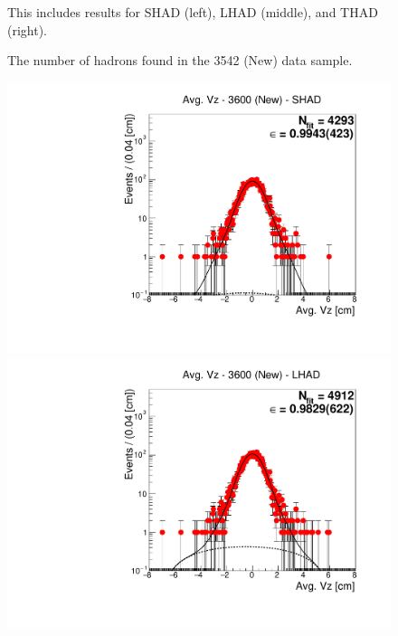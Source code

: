 \begin{figure}[H]
\caption{The number of hadrons found in the 3542 (New) data sample.}
{This includes results for SHAD (left), LHAD (middle), and THAD (right).}
\label{fig:hadron_fits_3542_new}
\end{figure}


\begin{figure}[H]
\centering
\includegraphics[scale=0.25]{figures/plots/nonDDbar_fit_results/3650_new/fit_new_3600_data_SHAD.pdf}
\hspace{-0.5cm}
\includegraphics[scale=0.25]{figures/plots/nonDDbar_fit_results/3650_new/fit_new_3600_data_LHAD.pdf}
\hspace{-0.5cm}

\end{figure}
